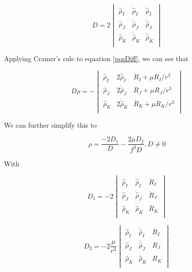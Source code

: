 \documentclass[11pt,twoside,letterpaper]{article}
\begin{document}
  \begin{equation} \label{D}
    D = 2\begin{vmatrix}
    \hat{\rho}_I& \dot{\hat{\rho}}_I& \ddot{\hat{\rho}}_I \\
    \hat{\rho}_J& \dot{\hat{\rho}}_J& \ddot{\hat{\rho}}_J \\
    \hat{\rho}_K& \dot{\hat{\rho}}_K& \ddot{\hat{\rho}}_K \\
    \end{vmatrix}
  \end{equation}

  Applying Cramer's rule to equation \ref{posDiff}, we can see that

  \begin{equation} \label{slantRange1}
    D\rho = -\begin{vmatrix}
    \hat{\rho}_I& 2\dot{\hat{\rho}}_I& \ddot{R}_I
    + \mu R_I/r^3 \\
    \hat{\rho}_J& 2\dot{\hat{\rho}}_J& \ddot{R}_J
    + \mu R_J/r^3 \\
    \hat{\rho}_K& 2\dot{\hat{\rho}}_K& \ddot{R}_K
    + \mu R_K/r^3 \\
    \end{vmatrix}
  \end{equation}

  We can further simplify this to

  \begin{equation} \label{slantRange2}
    \rho = \frac{-2D_1}{D} - \frac{2\mu D_2}{f^3D} , D \neq 0
  \end{equation}

  With

  \begin{equation} \label{D1}
    D_1 = -2\begin{vmatrix}
    \hat{\rho}_I& \dot{\hat{\rho}}_I& \ddot{R}_I \\
    \hat{\rho}_J& \dot{\hat{\rho}}_J& \ddot{R}_J \\
    \hat{\rho}_K& \dot{\hat{\rho}}_K& \ddot{R}_K \\
    \end{vmatrix}
  \end{equation}

  \begin{equation} \label{D2}
    D_2 = -2\frac{\mu}{r^3}\begin{vmatrix}
    \hat{\rho}_I& \dot{\hat{\rho}}_I& R_I \\
    \hat{\rho}_J& \dot{\hat{\rho}}_J& R_J \\
    \hat{\rho}_K& \dot{\hat{\rho}}_K& R_K \\
    \end{vmatrix}
  \end{equation}
\end{document}
